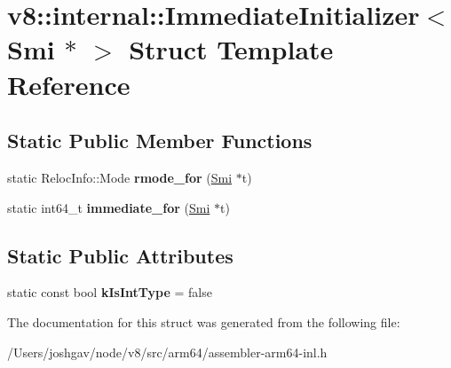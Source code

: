 \hypertarget{structv8_1_1internal_1_1_immediate_initializer_3_01_smi_01_5_01_4}{}\section{v8\+:\+:internal\+:\+:Immediate\+Initializer$<$ Smi $\ast$ $>$ Struct Template Reference}
\label{structv8_1_1internal_1_1_immediate_initializer_3_01_smi_01_5_01_4}
\subsection*{Static Public Member Functions}
\begin{DoxyCompactItemize}
\item 
static Reloc\+Info\+::\+Mode {\bfseries rmode\+\_\+for} (\hyperlink{classv8_1_1internal_1_1_smi}{Smi} $\ast$t)\hypertarget{structv8_1_1internal_1_1_immediate_initializer_3_01_smi_01_5_01_4_afc97f5c8da005b79dd1d51c4b6cbd34b}{}\label{structv8_1_1internal_1_1_immediate_initializer_3_01_smi_01_5_01_4_afc97f5c8da005b79dd1d51c4b6cbd34b}

\item 
static int64\+\_\+t {\bfseries immediate\+\_\+for} (\hyperlink{classv8_1_1internal_1_1_smi}{Smi} $\ast$t)\hypertarget{structv8_1_1internal_1_1_immediate_initializer_3_01_smi_01_5_01_4_a95db4ed47f19551bb6a128ab1f5c6a9e}{}\label{structv8_1_1internal_1_1_immediate_initializer_3_01_smi_01_5_01_4_a95db4ed47f19551bb6a128ab1f5c6a9e}

\end{DoxyCompactItemize}
\subsection*{Static Public Attributes}
\begin{DoxyCompactItemize}
\item 
static const bool {\bfseries k\+Is\+Int\+Type} = false\hypertarget{structv8_1_1internal_1_1_immediate_initializer_3_01_smi_01_5_01_4_a6d6a7082678fbde037eede096df85d93}{}\label{structv8_1_1internal_1_1_immediate_initializer_3_01_smi_01_5_01_4_a6d6a7082678fbde037eede096df85d93}

\end{DoxyCompactItemize}


The documentation for this struct was generated from the following file\+:\begin{DoxyCompactItemize}
\item 
/\+Users/joshgav/node/v8/src/arm64/assembler-\/arm64-\/inl.\+h\end{DoxyCompactItemize}
